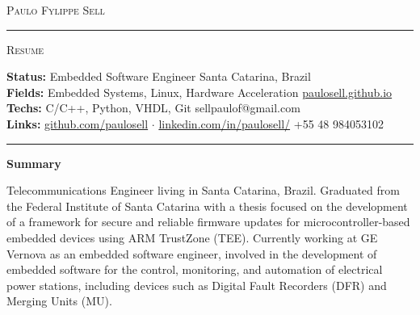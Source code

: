 \documentclass[10pt,A4]{article}
\newcommand{\sectionspace}{
	\vspace{0.1cm}
}
\newcommand{\cvsection}[1]
{
	\begin{center}
		\large\textcolor{sectcol}{\textbf{#1}}
	\end{center}
	\sectionspace
}
\newcommand{\metasection}[2]
{
\footnotesize{#2} \hspace*{\fill} \footnotesize{#1}\\[1pt]
}
\begin{document}
\pagestyle{fancy}	








\vspace{-8pt}
\begin{center}
	\HUGE \textsc{Paulo Fylippe Sell} \textcolor{sectcol}{\rule[-1mm]{1mm}{0.9cm}} \textsc{Resume}\\[2pt]
	
\end{center}



\vspace{6pt}


\metasection{Santa Catarina, Brazil}{\textbf{Status:} Embedded Software Engineer}
\metasection{\href{https://paulosell.github.io}{paulosell.github.io}}{\textbf{Fields:} Embedded Systems, Linux, Hardware Acceleration}
\metasection{sellpaulof@gmail.com}{\textbf{Techs:} C/C++, Python, VHDL, Git}
\metasection{+55 48 984053102}{\textbf{Links:} \href{https://github.com/paulosell}{github.com/paulosell} $\cdot$ \href{https://www.linkedin.com/in/paulosell/}{linkedin.com/in/paulosell/}} 
\vspace{-2pt}
\textcolor{softcol}{\hrule}
\vspace{6pt}

\normalsize

\vspace{-6pt}
\cvsection{Summary}
Telecommunications Engineer living in Santa Catarina, Brazil. Graduated from the Federal Institute of Santa Catarina with a thesis focused on the development of a framework for secure and reliable firmware updates for microcontroller-based embedded devices using ARM TrustZone (TEE). Currently working at GE Vernova as an embedded software engineer, involved in the development of embedded software for the control, monitoring, and automation of electrical power stations, including devices such as Digital Fault Recorders (DFR) and Merging Units (MU).\\
\end{document}
